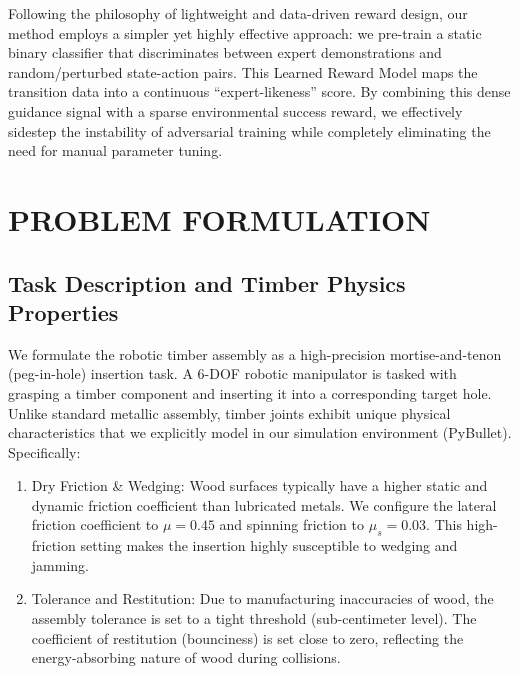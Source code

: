 \documentclass[conference]{IEEEtran}
\begin{document}
Following the philosophy of lightweight and data-driven reward design, our method employs a simpler yet highly effective approach: we pre-train a static binary classifier that discriminates between expert demonstrations and random/perturbed state-action pairs. This Learned Reward Model maps the transition data into a continuous ``expert-likeness'' score. By combining this dense guidance signal with a sparse environmental success reward, we effectively sidestep the instability of adversarial training while completely eliminating the need for manual parameter tuning.

\section{PROBLEM FORMULATION}
\subsection{Task Description and Timber Physics Properties}
We formulate the robotic timber assembly as a high-precision mortise-and-tenon (peg-in-hole) insertion task. A 6-DOF robotic manipulator is tasked with grasping a timber component and inserting it into a corresponding target hole. Unlike standard metallic assembly, timber joints exhibit unique physical characteristics that we explicitly model in our simulation environment (PyBullet). Specifically:
\begin{enumerate}
    \item Dry Friction \& Wedging: Wood surfaces typically have a higher static and dynamic friction coefficient than lubricated metals. We configure the lateral friction coefficient to $\mu = 0.45$ and spinning friction to $\mu_s = 0.03$. This high-friction setting makes the insertion highly susceptible to wedging and jamming.
    \item Tolerance and Restitution: Due to manufacturing inaccuracies of wood, the assembly tolerance is set to a tight threshold (sub-centimeter level). The coefficient of restitution (bounciness) is set close to zero, reflecting the energy-absorbing nature of wood during collisions.
\end{enumerate}
\end{document}
